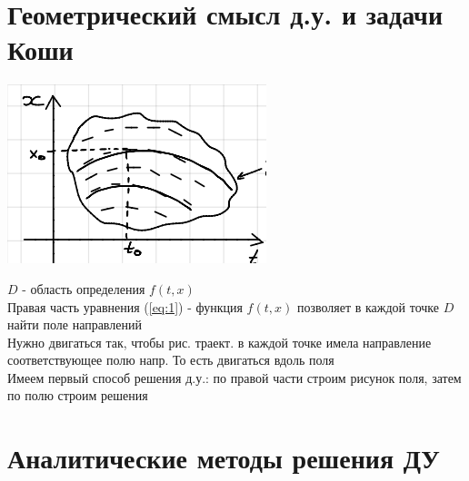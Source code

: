 \documentclass[12pt,a4paper,hidelinks]{article}            %
\begin{document}
\section{Геометрический смысл д.у. и задачи Коши}
\begin{center}
	\includegraphics[scale=0.8]{images/graph2}
\end{center}
$D$ - область определения $f(t,x)$ \\
Правая часть уравнения (\ref{eq:1}) - функция $f(t,x)$ позволяет в каждой точке $D$ найти поле направлений \\
Нужно двигаться так, чтобы рис. траект. в каждой точке имела направление соответствующее полю напр. То есть двигаться вдоль поля \\
Имеем первый способ решения д.у.: по правой части строим рисунок поля, затем по полю строим решения

\newpage
\section{Аналитические методы решения ДУ}
\end{document}
